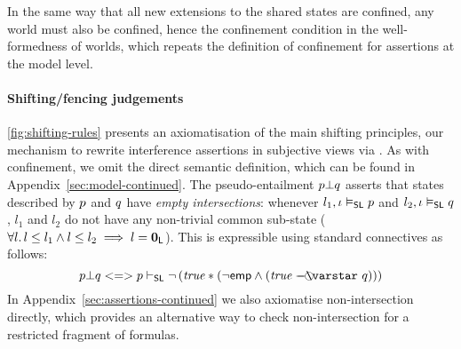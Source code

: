 In the same way that all new extensions to the shared states are confined, any world
must also be confined, hence the confinement condition in the
well-formedness of worlds, which repeats the definition of confinement
for assertions at the model level.


\paragraph{Shifting/fencing judgements}
\fig\ref{fig:shifting-rules} presents an axiomatisation of the main
shifting principles, our mechanism to rewrite interference assertions
in subjective views via \shiftRule. As with confinement, we omit the
direct semantic definition, which can be found in Appendix~\ref{sec:model-continued}.  The
pseudo-entailment $\separate{\lass{P}}{\lass{Q}}$ asserts that states
described by $\lass{P}$ and $\lass{Q}$ have \emph{empty
  intersections}: whenever $l_1, \lenv \slsat \lass{P}$ and $l_2,
\lenv \slsat \lass{Q}$, $l_1$ and $l_2$ do not have any non-trivial
common sub-state ($\forall l.\, l \leq l_1 \land l \leq l_2 \implies l =
\mathbf{0}_{\mathsf{L}}$). This is expressible using standard connectives as follows:
\[
\separate{\lass{P}}{\lass{Q}} <=> \lass{P} \slentails \neg\left( \m{true} * (\neg\emp \land (\m{true} \septraction \lass{Q}) ) \right)
\]
In Appendix~\ref{sec:assertions-continued} we also axiomatise
non-intersection directly, which provides an alternative way to check
non-intersection for a restricted fragment of formulas.

